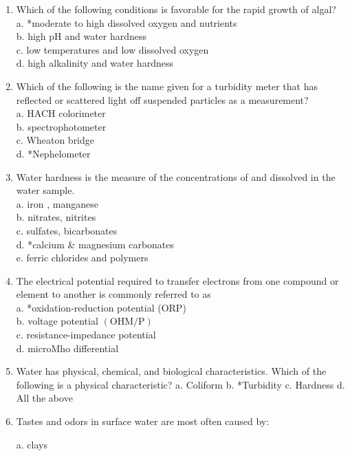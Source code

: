 \begin{enumerate}[1.]
\item Which of the following conditions is favorable for the rapid growth of algal?\\
a. *moderate to high dissolved oxygen and nutrients\\
b. high $\mathrm{pH}$ and water hardness\\
c. low temperatures and low dissolved oxygen\\
d. high alkalinity and water hardness\\

  \item Which of the following is the name given for a turbidity meter that has reflected or scattered light off suspended particles as a measurement?\\
a. HACH colorimeter\\
b. spectrophotometer\\
c. Wheaton bridge\\
d. *Nephelometer\\

  \item Water hardness is the measure of the concentrations of and dissolved in the water sample.\\
a. iron , manganese\\
b. nitrates, nitrites\\
c. sulfates, bicarbonates\\
d. *calcium \& magnesium carbonates\\
e. ferric chlorides and polymers\\

  \item The electrical potential required to transfer electrons from one compound or element to another is commonly referred to as\\
a. *oxidation-reduction potential (ORP)\\
b. voltage potential $(\mathrm{OHM} / \mathrm{P})$\\
c. resistance-impedance potential\\
d. microMho differential 

\item Water has physical, chemical, and biological characteristics. Which of the following is a
physical characteristic?
a. Coliform
b. *Turbidity
c. Hardness
d. All the above

  \item Tastes and odors in surface water are most often caused by:

a. clays


\end{enumerate}
